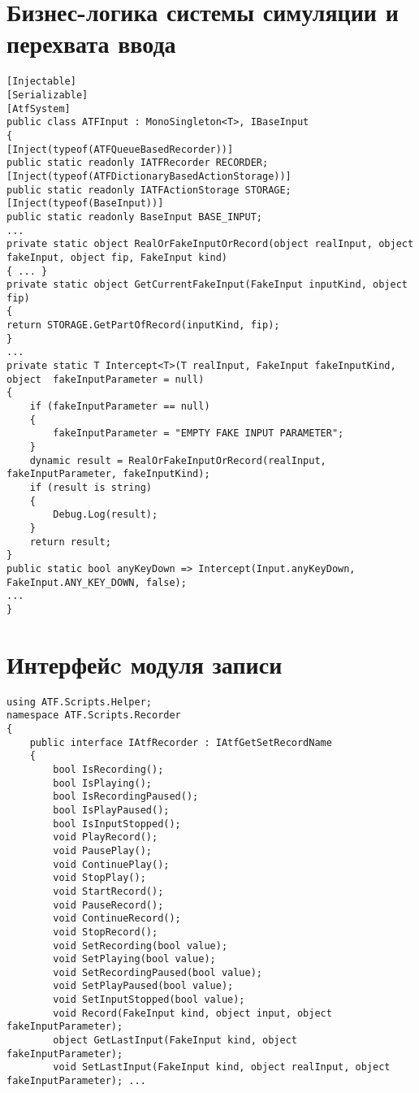 \section{Бизнес-логика системы симуляции и перехвата ввода}
\begin{lstlisting}[caption={Бизнес-логика системы симуляции и перехвата ввода},label=input]
[Injectable]
[Serializable]
[AtfSystem]
public class ATFInput : MonoSingleton<T>, IBaseInput
{
[Inject(typeof(ATFQueueBasedRecorder))]
public static readonly IATFRecorder RECORDER;
[Inject(typeof(ATFDictionaryBasedActionStorage))]
public static readonly IATFActionStorage STORAGE;
[Inject(typeof(BaseInput))]
public static readonly BaseInput BASE_INPUT;
...
private static object RealOrFakeInputOrRecord(object realInput, object fakeInput, object fip, FakeInput kind)
{ ... }
private static object GetCurrentFakeInput(FakeInput inputKind, object fip)
{
return STORAGE.GetPartOfRecord(inputKind, fip);
}
...
private static T Intercept<T>(T realInput, FakeInput fakeInputKind, object 	fakeInputParameter = null)
{
    if (fakeInputParameter == null)
    {
        fakeInputParameter = "EMPTY FAKE INPUT PARAMETER";
    }
    dynamic result = RealOrFakeInputOrRecord(realInput, fakeInputParameter, fakeInputKind);
    if (result is string)
    {
        Debug.Log(result);
    }
    return result;
}
public static bool anyKeyDown => Intercept(Input.anyKeyDown, FakeInput.ANY_KEY_DOWN, false);
...
}
\end{lstlisting}
\newpage
\section{Интерфейc модуля записи}
\begin{lstlisting}[caption={Интерфейc модуля записи},label=iRecorder]
using ATF.Scripts.Helper;
namespace ATF.Scripts.Recorder
{
    public interface IAtfRecorder : IAtfGetSetRecordName
    {
        bool IsRecording();
        bool IsPlaying();
        bool IsRecordingPaused();
        bool IsPlayPaused();
        bool IsInputStopped();
        void PlayRecord();
        void PausePlay();
        void ContinuePlay();
        void StopPlay();
        void StartRecord();
        void PauseRecord();
        void ContinueRecord();
        void StopRecord();
        void SetRecording(bool value);
        void SetPlaying(bool value);
        void SetRecordingPaused(bool value);
        void SetPlayPaused(bool value);
        void SetInputStopped(bool value);
        void Record(FakeInput kind, object input, object fakeInputParameter);
        object GetLastInput(FakeInput kind, object fakeInputParameter);
        void SetLastInput(FakeInput kind, object realInput, object fakeInputParameter); ...
\end{lstlisting}
\newpage
